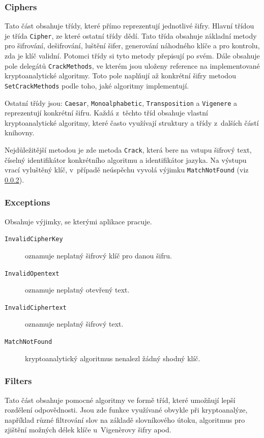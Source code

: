 \documentclass[12pt]{article}
\theoremstyle{definition}
\newcommand{\code}[1]{\texttt{#1}}
\begin{document}
\subsubsection{Ciphers}
Tato část obsahuje třídy, které přímo reprezentují jednotlivé šifry. Hlavní třídou je třída \code{Cipher}, ze které ostatní třídy dědí. Tato třída obsahuje základní metody pro šifrování, dešifrování, luštění šifer, generování náhodného klíče a pro kontrolu, zda je klíč validní. Potomci třídy si tyto metody přepisují po svém. Dále obsahuje pole delegátů \code{CrackMethods}, ve kterém jsou uloženy reference na implementované kryptoanalytické algoritmy. Toto pole naplňují až konkrétní šifry metodou \code{SetCrackMethods} podle toho, jaké algoritmy implementují. 

Ostatní třídy jsou: \code{Caesar}, \code{Monoalphabetic}, \code{Transposition} a \code{Vigenere} a reprezentují konkrétní šifru. Každá z~těchto tříd obsahuje vlastní kryptoanalytické algoritmy, které často využívají struktury a třídy z~dalších částí knihovny. 
 
Nejdůležitější metodou je zde metoda \code{Crack}, která bere na vstupu šifrový text, číselný identifikátor konkrétního algoritmu a identifikátor jazyka. Na výstupu vrací vyluštěný klíč, v~případě neúspěchu vyvolá výjimku \code{MatchNotFound} (viz \ref{exceptions}).
 
 \subsubsection{Exceptions}
 \label{exceptions}
 Obsahuje výjimky, se kterými aplikace pracuje. 
 
 \begin{description}
  \item[\code{InvalidCipherKey}] oznamuje neplatný šifrový klíč pro danou šifru.
  \item[\code{InvalidOpentext}] oznamuje neplatný otevřený text.
  \item[\code{InvalidCiphertext}] oznamuje neplatný šifrový text.
  \item[\code{MatchNotFound}] kryptoanalytický algoritmus nenalezl žádný shodný klíč. 
\end{description}

\subsubsection{Filters}

Tato část obsahuje pomocné algoritmy ve formě tříd, které umožňují lepší rozdělení odpovědnosti. Jsou zde funkce využívané obvykle při kryptoanalýze, například různé filtrování slov na základě slovníkového útoku, algoritmus pro zjištění možných délek klíče u~Vigenèrovy šifry apod. 
\end{document}
